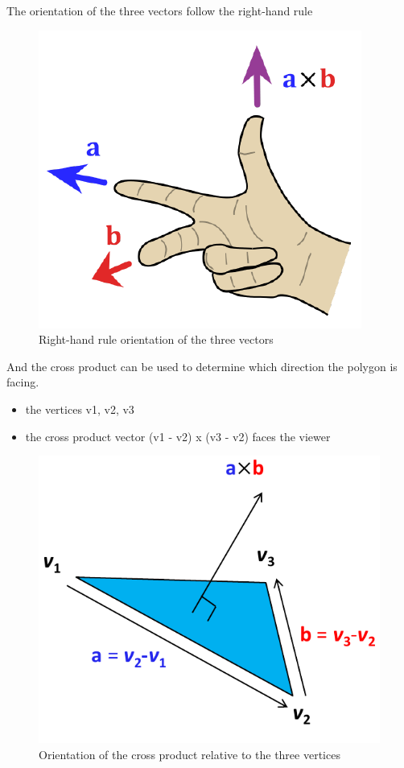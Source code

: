 \documentclass[
]{book}
\providecommand{\tightlist}{%
  \setlength{\itemsep}{0pt}\setlength{\parskip}{0pt}}
\begin{document}
The orientation of the three vectors follow the {right-hand rule}

\begin{figure}
\centering
\includegraphics{img/08-image25.png}
\caption{\label{fig:rhr}Right-hand rule orientation of the three vectors}
\end{figure}

And the cross product can be used to determine which direction the polygon is facing.

\begin{itemize}
\tightlist
\item
  the vertices v1, v2, v3
\item
  the cross product vector (v1 - v2) x (v3 - v2) faces the viewer
\end{itemize}

\begin{figure}
\centering
\includegraphics{img/08-image26.png}
\caption{\label{fig:cross-prod-vec}Orientation of the cross product relative to the three vertices}
\end{figure}
\end{document}
